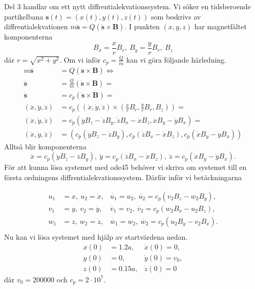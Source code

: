 \documentclass[a4paper]{article}
\begin{document}
Del 3 handlar om ett nytt diffrentialekvationssystem. Vi söker en tidsberoende
partikelbana $\mathbf{s}(t) = (x(t), y(t), z(t))$ som beskrivs av
diffrentialekvationen $m\mathbf{\ddot{s}} = Q(\mathbf{\dot{s}} \times
\mathbf{B})$. I punkten $(x, y, z)$ har magnetfältet komponenterna
$$
B_x = \frac{x}{r}B_r,\ B_y = \frac{y}{r}B_r,\ B_z
$$
där $r = \sqrt{x^2 + y^2}$. Om vi inför $c_p = \frac{Q}{m}$ kan vi göra följande
härledning.
\begin{eqnarray*}
  m\mathbf{\ddot{s}} & = Q(\mathbf{\dot{s}} \times \mathbf{B}) \Leftrightarrow
  \\
  \mathbf{\ddot{s}} & = \frac{Q}{m}(\mathbf{\dot{s}} \times \mathbf{B}) = 
  \\
  \mathbf{\ddot{s}} & = c_p(\mathbf{\dot{s}} \times \mathbf{B}) = 
  \\
  (\ddot{x}, \ddot{y}, \ddot{z})& = c_p((\dot{x},\dot{y},\dot{z}) \times
  (\frac{x}{r}B_r,\frac{y}{r}B_r,B_z)) = 
  \\
  (\ddot{x}, \ddot{y}, \ddot{z})& = c_p(\dot{y}B_z - \dot{z}B_y, 
  \dot{z}B_x - \dot{x}B_z, \dot{x}B_y - \dot{y}B_x) = 
  \\
  (\ddot{x}, \ddot{y}, \ddot{z})& = (c_p(\dot{y}B_z - \dot{z}B_y), 
  c_p(\dot{z}B_x - \dot{x}B_z), c_p(\dot{x}B_y - \dot{y}B_x))
\end{eqnarray*}
Alltså blir komponenterna 
$$
\ddot{x} = c_p(\dot{y}B_z - \dot{z}B_y),\ \ddot{y} = c_p(\dot{z}B_x -
\dot{x}B_z),\ \ddot{z} = c_p(\dot{x}B_y - \dot{y}B_x).
$$
För att kunna lösa systemet med ode45 behöver vi skriva om systemet till en
första ordningens diffrentialekvationssystem. Därför inför vi betäckningarna

\begin{align*}
  u_1 &= x,\ u_2 = \dot{x}, & \dot{u_1} = u_2,\ \dot{u_2} = c_p(v_2B_z -
  w_2B_y),\\
  v_1 &= y,\ v_2 = \dot{y},& \dot{v_1} = v_2,\ \dot{v_2} = c_p(w_2B_x - u_2B_z),\\
  w_1 &= z,\ w_2 = \dot{z},& \dot{w_1} = w_2,\ \dot{w_2} = c_p(u_2B_y - v_2B_x).\\
\end{align*}
Nu kan vi lösa systemet med hjälp av startvärdena nedan.
\begin{align*}
  x(0) &= 1.2a, & \dot{x}(0) = 0,\\
  y(0) &= 0, & \dot{y}(0) = v_0,\\
  z(0) &= 0.15a, & \dot{z}(0) = 0
\end{align*}
där $v_0 = 200000$ och $c_p = 2 \cdot 10^7$.
\end{document}
